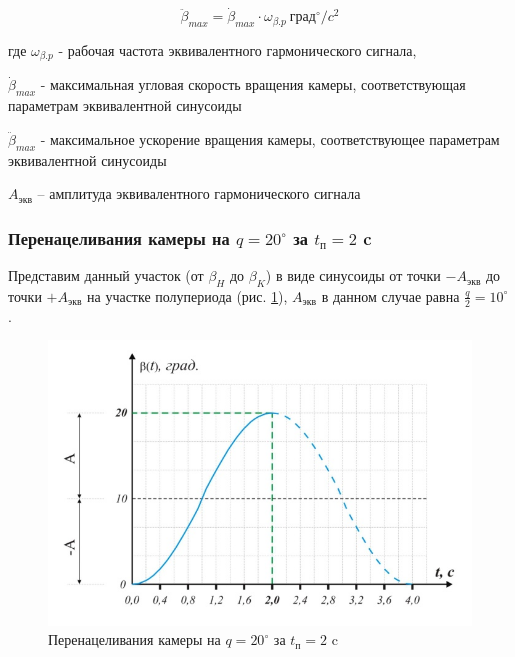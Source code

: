 \begin{equation}
    \label{max_acceleration_for_equiv_signal}
    \ddot{\beta}_{max} = \dot{\beta}_{max} \cdot \omega_{\beta.p} ~\text{град}^{\circ} / c^{2}
\end{equation}

где $\omega_{\beta.p}$ - рабочая частота эквивалентного гармонического сигнала,

$\dot{\beta}_{max}$ - максимальная угловая скорость вращения камеры, соответствующая параметрам эквивалентной синусоиды

$\ddot{\beta}_{max}$ - максимальное ускорение вращения камеры, соответствующее параметрам эквивалентной синусоиды

$A_\text{экв}$ – амплитуда эквивалентного гармонического сигнала

\subsubsection{Перенацеливания камеры на $q = 20^{\circ}$ за $t_\text{п} = 2$ c}

Представим данный участок (от $\beta_{H}$ до $\beta_{K}$) в виде синусоиды от точки $-A_\text{экв}$ до точки $+A_\text{экв}$ на участке полупериода (рис. \ref{retarget_20grad_2sec}), $A_\text{экв}$ в данном случае равна $\frac{q}{2} = 10^{\circ}$.

\begin{figure}[h!]
    \centering
    \includegraphics[keepaspectratio]{./src/pictures/retarget_equivalent_input_signals/20grad_2sec}
    \caption{Перенацеливания камеры на $q = 20^{\circ}$ за $t_\text{п} = 2$ c}
    \label{retarget_20grad_2sec}
\end{figure}

